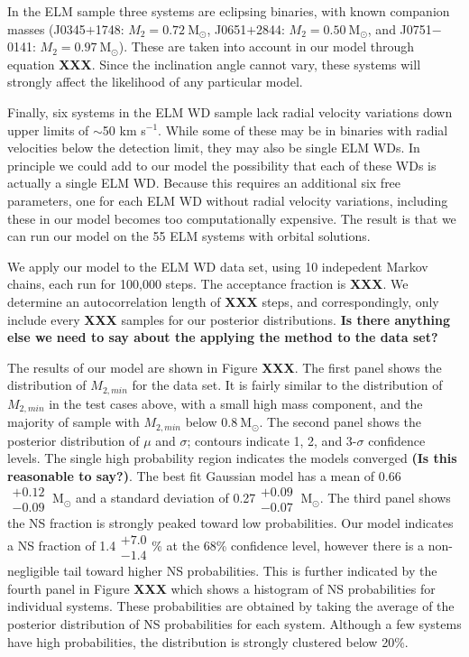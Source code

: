 \documentclass[letterpaper,12pt,preprint]{aastex}
\newcommand{\Msun}{\mathrm{M}_\odot}
\begin{document}
In the ELM sample three systems are eclipsing binaries, with known companion masses (J0345$+$1748: $M_2=0.72~\Msun$, J0651$+$2844: $M_2=0.50~\Msun$, and J0751$-$0141: $M_2=0.97~\Msun$). These are taken into account in our model through equation {\bf XXX}. Since the inclination angle cannot vary, these systems will strongly affect the likelihood of any particular model. 

Finally, six systems in the ELM WD sample lack radial velocity variations down upper limits of $\sim$50 km s$^{-1}$. While some of these may be in binaries with radial velocities below the detection limit, they may also be single ELM WDs. In principle we could add to our model the possibility that each of these WDs is actually a single ELM WD. Because this requires an additional six free parameters, one for each ELM WD without radial velocity variations, including these in our model becomes too computationally expensive. The result is that we can run our model on the 55 ELM systems with orbital solutions.


We apply our model to the ELM WD data set, using 10 indepedent Markov chains, each run for 100,000 steps. The acceptance fraction is {\bf XXX}. We determine an autocorrelation length of {\bf XXX} steps, and correspondingly, only include every {\bf XXX} samples for our posterior distributions. {\bf Is there anything else we need to say about the applying the method to the data set?}


The results of our model are shown in Figure {\bf XXX}. The first panel shows the distribution of $M_{2,min}$ for the data set. It is fairly similar to the distribution of $M_{2,min}$ in the test cases above, with a small high mass component, and the majority of sample with $M_{2,min}$ below $0.8~\Msun$. The second panel shows the posterior distribution of $\mu$ and $\sigma$; contours indicate 1, 2, and 3-$\sigma$ confidence levels. The single high probability region indicates the models converged {\bf (Is this reasonable to say?)}. The best fit Gaussian model has a mean of 0.66 $\substack{+0.12 \\ -0.09}~\Msun$ and a standard deviation of 0.27$\substack{+0.09 \\ -0.07}~\Msun$. The third panel shows the NS fraction is strongly peaked toward low probabilities. Our model indicates a NS fraction of 1.4$\substack{+7.0 \\ -1.4}$\% at the 68\% confidence level, however there is a non-negligible tail toward higher NS probabilities. This is further indicated by the fourth panel in Figure {\bf XXX} which shows a histogram of NS probabilities for individual systems. These probabilities are obtained by taking the average of the posterior distribution of NS probabilities for each system. Although a few systems have high probabilities, the distribution is strongly clustered below 20\%.
\end{document}
